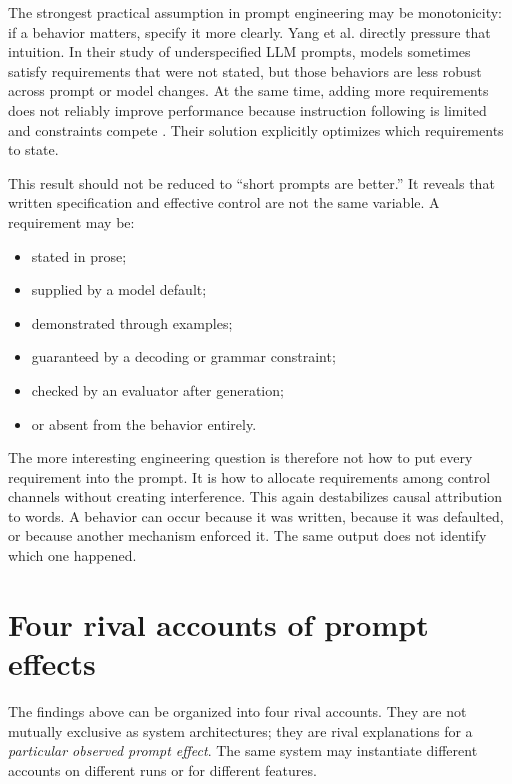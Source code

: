 \documentclass[11pt]{article}
\begin{document}
The strongest practical assumption in prompt engineering may be monotonicity: if a behavior matters, specify it more clearly. Yang et al. directly pressure that intuition. In their study of underspecified LLM prompts, models sometimes satisfy requirements that were not stated, but those behaviors are less robust across prompt or model changes. At the same time, adding more requirements does not reliably improve performance because instruction following is limited and constraints compete \citep{Yang2025PromptsDontSay}. Their solution explicitly optimizes which requirements to state.

This result should not be reduced to ``short prompts are better.'' It reveals that written specification and effective control are not the same variable. A requirement may be:
\begin{itemize}[leftmargin=1.5em]
\item stated in prose;
\item supplied by a model default;
\item demonstrated through examples;
\item guaranteed by a decoding or grammar constraint;
\item checked by an evaluator after generation;
\item or absent from the behavior entirely.
\end{itemize}

The more interesting engineering question is therefore not how to put every requirement into the prompt. It is how to allocate requirements among control channels without creating interference. This again destabilizes causal attribution to words. A behavior can occur because it was written, because it was defaulted, or because another mechanism enforced it. The same output does not identify which one happened.

\section{Four rival accounts of prompt effects}

The findings above can be organized into four rival accounts. They are not mutually exclusive as system architectures; they are rival explanations for a \emph{particular observed prompt effect}. The same system may instantiate different accounts on different runs or for different features.
\end{document}
